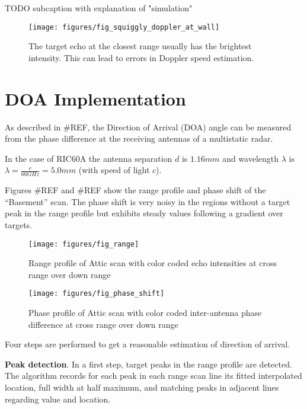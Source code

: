 TODO subcaption with explanation of "simulation"
\begin{figure}[htbp]
    \centering
    \label{fig:fig_squiggly_doppler_at_wall}
    \texttt{[image: figures/fig\_squiggly\_doppler\_at\_wall]}
    \caption{The target echo at the closest range usually has the brightest intensity. This can lead to errors in Doppler speed estimation.}
\end{figure}

\section{DOA Implementation}\label{doa-implementation}

As described in \#REF, the Direction of Arrival (DOA) angle can be
measured from the phase difference at the receiving antennas of a
multistatic radar.

In the case of RIC60A the antenna separation \(d\) is \(1.16mm\) and
wavelength \(\lambda\) is \(\lambda=\frac{c}{60GHz}=5.0mm\) (with speed
of light \(c\)).

Figures \#REF and \#REF show the range profile and phase shift of the
``Basement'' scan. The phase shift is very noisy in the regions without
a target peak in the range profile but exhibits steady values following
a gradient over targets.

\begin{figure}[htbp]
    \centering
    \label{fig:fig_range}
    \texttt{[image: figures/fig\_range]}
    \caption{Range profile of Attic scan with color coded echo intensities at cross range over down range}
\end{figure}

\begin{figure}[htbp]
    \centering
    \label{fig:fig_phase_shift}
    \texttt{[image: figures/fig\_phase\_shift]}
    \caption{Phase profile of Attic scan with color coded inter-antenna phase difference at cross range over down range}
\end{figure}

Four steps are performed to get a reasonable estimation of direction of
arrival.

\textbf{Peak detection}. In a first step, target peaks in the
range profile are detected. The algorithm records for each peak in each
range scan line its fitted interpolated location, full width at half
maximum, and matching peaks in adjacent lines regarding value and
location.

